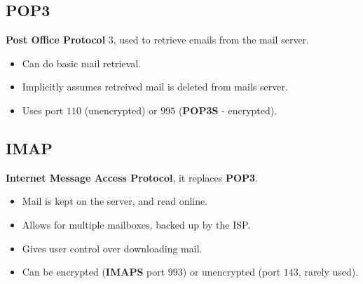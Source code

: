 \subsection{POP3}
\textbf{Post Office Protocol} 3, used to retrieve emails from the mail server.
\begin{itemize}
    \setlength\itemsep{0em}
    \item Can do basic mail retrieval.
    \item Implicitly assumes retreived mail is deleted from mails server.
    \item Uses port $110$ (unencrypted) or $995$ (\textbf{POP3S} - encrypted).
\end{itemize}
\subsection{IMAP}
\textbf{Internet Message Access Protocol}, it replaces \textbf{POP3}.
\begin{itemize}
    \setlength\itemsep{0em}
    \item Mail is kept on the server, and read online.
    \item Allows for multiple mailboxes, backed up by the ISP.
    \item Gives user control over downloading mail.
    \item Can be encrypted (\textbf{IMAPS} port $993$) or unencrypted (port $143$, rarely used).
\end{itemize}

